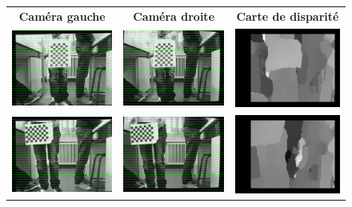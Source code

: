 \begin{figure}
    \begin{center}
        \begin{tabular}{ccc}
            \textbf{Caméra gauche} & \textbf{Caméra droite} & \textbf{Carte de disparité} \\
            \includegraphics[width=0.3\linewidth]{rcs/rem0l.png} & \includegraphics[width=0.3\linewidth]{rcs/rem0r.png} & \includegraphics[width=0.3\linewidth]{rcs/disp0.png} \\
            \includegraphics[width=0.3\linewidth]{rcs/rem1l.png} & \includegraphics[width=0.3\linewidth]{rcs/rem1r.png} & \includegraphics[width=0.3\linewidth]{rcs/disp1.png} \\

\end{tabular}
\end{center}
\end{figure}
